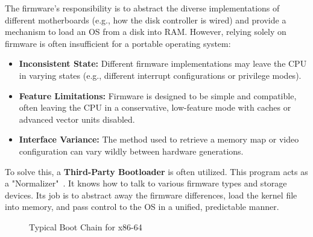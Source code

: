 \documentclass[a4paper,10pt,twoside]{report}
\theoremstyle{definition}
\begin{document}
The firmware's responsibility is to abstract the diverse implementations of different motherboards (e.g., how the disk controller is wired) and provide a mechanism to load an OS from a disk into RAM. However, relying solely on firmware is often insufficient for a portable operating system:
\begin{itemize}
    \item \textbf{Inconsistent State:} Different firmware implementations may leave the CPU in varying states (e.g., different interrupt configurations or privilege modes).
    \item \textbf{Feature Limitations:} Firmware is designed to be simple and compatible, often leaving the CPU in a conservative, low-feature mode with caches or advanced vector units disabled.
    \item \textbf{Interface Variance:} The method used to retrieve a memory map or video configuration can vary wildly between hardware generations.
\end{itemize}

To solve this, a \textbf{Third-Party Bootloader} is often utilized. This program acts as a "Normalizer"~\cite{Limine-Spec}. It knows how to talk to various firmware types and storage devices. Its job is to abstract away the firmware differences, load the kernel file into memory, and pass control to the OS in a unified, predictable manner.

\begin{figure}[htbp]
\centering
{}
\caption{Typical Boot Chain for x86-64}
\label{fig:boot_chain}
\end{figure}
\end{document}
